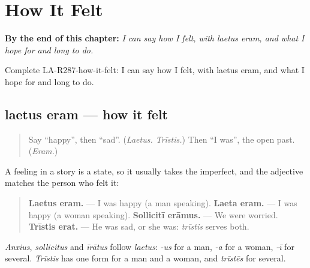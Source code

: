 
\chapter{How It Felt}
\label{ch:la-how-it-felt}

\begin{chapteropening}
\textbf{By the end of this chapter:} \emph{I can say how I felt, with laetus eram, and what I hope for and long to do.}

Complete LA-R287-how-it-felt: I can say how I felt, with laetus eram, and what I hope for and long to do.
\end{chapteropening}

\section[laetus eram, laeta eram]{laetus eram — how it felt}

\label{lesson:LA-C287-laetus-eram}



\begin{quote}
Say \textquotedblleft{}happy\textquotedblright{}, then \textquotedblleft{}sad\textquotedblright{}. (\emph{Laetus. Trīstis.}) Then \textquotedblleft{}I was\textquotedblright{}, the open past. (\emph{Eram.})
\end{quote}

\begin{grammarlens}[title={Grammar Lens: the feeling agrees with who felt it}]
A feeling in a story is a state, so it usually takes the imperfect, and the adjective matches the person who felt it:

\begin{quote}
\textbf{Laetus eram.} — I was happy (a man speaking). \textbf{Laeta eram.} — I was happy (a woman speaking). \textbf{Sollicitī erāmus.} — We were worried. \textbf{Trīstis erat.} — He was sad, or she was: \emph{trīstis} serves both.
\end{quote}

\emph{Anxius}, \emph{sollicitus} and \emph{īrātus} follow \emph{laetus}: \emph{-us} for a man, \emph{-a} for a woman, \emph{-ī} for several. \emph{Trīstis} has one form for a man and a woman, and \emph{trīstēs} for several.
\end{grammarlens}

